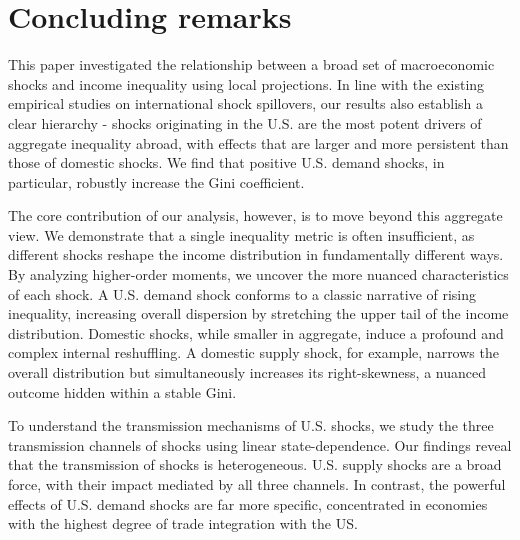 \documentclass[12pt, a4paper]{article}
\begin{document}

\newpage
\section{Concluding remarks}
This paper investigated the relationship between a broad set of macroeconomic shocks and income inequality using local projections. In line with the existing empirical studies on international shock spillovers, our results also establish a clear hierarchy - shocks originating in the U.S. are the most potent drivers of aggregate inequality abroad, with effects that are larger and more persistent than those of domestic shocks. We find that positive U.S. demand shocks, in particular, robustly increase the Gini coefficient.

The core contribution of our analysis, however, is to move beyond this aggregate view. We demonstrate that a single inequality metric is often insufficient, as different shocks reshape the income distribution in fundamentally different ways. By analyzing higher-order moments, we uncover the more nuanced characteristics of each shock. A U.S. demand shock conforms to a classic narrative of rising inequality, increasing overall dispersion by stretching the upper tail of the income distribution. Domestic shocks, while smaller in aggregate, induce a profound and complex internal reshuffling. A domestic supply shock, for example, narrows the overall distribution but simultaneously increases its right-skewness, a nuanced outcome hidden within a stable Gini.

To understand the transmission mechanisms of U.S. shocks, we study the three transmission channels of shocks using linear state-dependence. Our findings reveal that the transmission of shocks is heterogeneous. U.S. supply shocks are a broad force, with their impact mediated by all three channels. In contrast, the powerful effects of U.S. demand shocks are far more specific, concentrated in economies with the highest degree of trade integration with the US.
\end{document}
